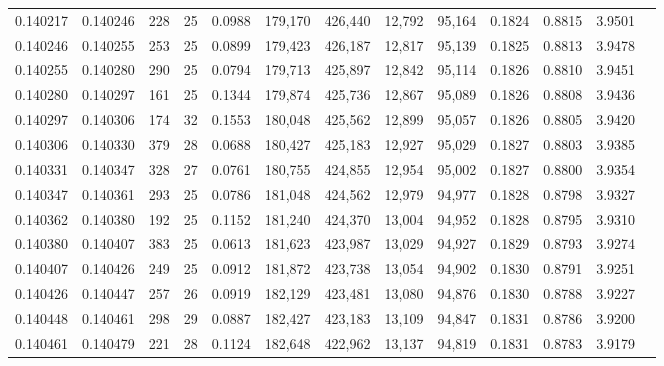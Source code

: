 \begin{tabular}{rrrrrrrrrrrrr}
0.140217 & 0.140246 & 228 &  25 &                                     0.0988 & 179,170 & 426,440 &  12,792 &  95,164 & 0.1824 & 0.8815 & 3.9501 \\
0.140246 & 0.140255 & 253 &  25 &                                     0.0899 & 179,423 & 426,187 &  12,817 &  95,139 & 0.1825 & 0.8813 & 3.9478 \\
0.140255 & 0.140280 & 290 &  25 &                                     0.0794 & 179,713 & 425,897 &  12,842 &  95,114 & 0.1826 & 0.8810 & 3.9451 \\
0.140280 & 0.140297 & 161 &  25 &                                     0.1344 & 179,874 & 425,736 &  12,867 &  95,089 & 0.1826 & 0.8808 & 3.9436 \\
0.140297 & 0.140306 & 174 &  32 &                                     0.1553 & 180,048 & 425,562 &  12,899 &  95,057 & 0.1826 & 0.8805 & 3.9420 \\
0.140306 & 0.140330 & 379 &  28 &                                     0.0688 & 180,427 & 425,183 &  12,927 &  95,029 & 0.1827 & 0.8803 & 3.9385 \\
0.140331 & 0.140347 & 328 &  27 &                                     0.0761 & 180,755 & 424,855 &  12,954 &  95,002 & 0.1827 & 0.8800 & 3.9354 \\
0.140347 & 0.140361 & 293 &  25 &                                     0.0786 & 181,048 & 424,562 &  12,979 &  94,977 & 0.1828 & 0.8798 & 3.9327 \\
0.140362 & 0.140380 & 192 &  25 &                                     0.1152 & 181,240 & 424,370 &  13,004 &  94,952 & 0.1828 & 0.8795 & 3.9310 \\
0.140380 & 0.140407 & 383 &  25 &                                     0.0613 & 181,623 & 423,987 &  13,029 &  94,927 & 0.1829 & 0.8793 & 3.9274 \\
0.140407 & 0.140426 & 249 &  25 &                                     0.0912 & 181,872 & 423,738 &  13,054 &  94,902 & 0.1830 & 0.8791 & 3.9251 \\
0.140426 & 0.140447 & 257 &  26 &                                     0.0919 & 182,129 & 423,481 &  13,080 &  94,876 & 0.1830 & 0.8788 & 3.9227 \\
0.140448 & 0.140461 & 298 &  29 &                                     0.0887 & 182,427 & 423,183 &  13,109 &  94,847 & 0.1831 & 0.8786 & 3.9200 \\
0.140461 & 0.140479 & 221 &  28 &                                     0.1124 & 182,648 & 422,962 &  13,137 &  94,819 & 0.1831 & 0.8783 & 3.9179 \\

\end{tabular}
